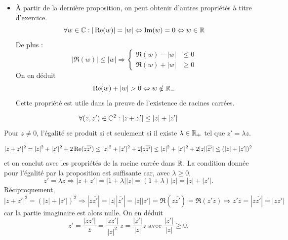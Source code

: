\begin{prop}
\begin{rems}
\begin{itemize}
 \item \`{A} partir de la dernière proposition, on peut obtenir d'autres propriétés à titre d'exercice.
\begin{displaymath}
 \forall w \in \C : |\Re(w)|=|w| \Leftrightarrow \Im(w)=0 \Leftrightarrow w\in \R
\end{displaymath}
De plus :
\begin{displaymath}
 |\Re(w)| \leq |w| \Rightarrow 
\left\lbrace
\begin{aligned}
 \Re(w) - |w| &\leq 0 \\
 \Re(w) + |w| &\geq 0
\end{aligned}
 \right. 
\end{displaymath}
On en déduit
\begin{displaymath}
 \Re(w) + |w| >0 \Leftrightarrow w\notin \R_-
\end{displaymath}
Cette propriété est utile dans la preuve de l'existence de racines carrées.
\end{itemize}
\end{rems}

\end{prop}
\begin{prop}
 \begin{displaymath}
 \forall (z,z')\in \C^2 : |z+z'|\leq|z|+|z'|
\end{displaymath}
Pour $z\neq 0$, l'égalité se produit si et seulement si il existe $\lambda \in \R_+$ tel que $z' = \lambda z$. 
\end{prop}
\begin{demo}
 \begin{displaymath}
 |z+z'|^2 =|z|^2+|z'|^2+2\Re(z\overline{z'})
\leq |z|^2+|z'|^2+2|z\overline{z'}|
\leq |z|^2+|z'|^2+2|z||\overline{z'}| \\
\leq (|z|+|z'|)^2
\end{displaymath}
et on conclut avec les propriétés de la racine carrée dans $\R$.\newline
La condition donnée pour l'égalité par la proposition est suffisante car, avec $\lambda \geq 0$,
\begin{displaymath}
 z'=\lambda z \Rightarrow 
 |z+z'| = |1+\lambda||z| =(1+\lambda)|z| = |z| + |z'|.
\end{displaymath}
Réciproquement, 
\begin{displaymath}
 |z+z'|^2 =(|z|+|z'|)^2
\Rightarrow |z\overline{z'}| = |z||\overline{z'}| = |z||z'| = \Re(z\overline{z'}) = \Re(z'\overline{z}) 
\Rightarrow z'\overline{z} = |z\overline{z'}| = |zz'|
\end{displaymath}
car la partie imaginaire est alors nulle. On en déduit
\begin{displaymath}
 z' = \frac{|zz'|}{\overline{z}} = \frac{|zz'|}{|z|^2}\, z = \frac{|z'|}{|z|}z\text{ avec } \frac{|z'|}{|z|} \geq 0.
\end{displaymath}
\end{demo}

